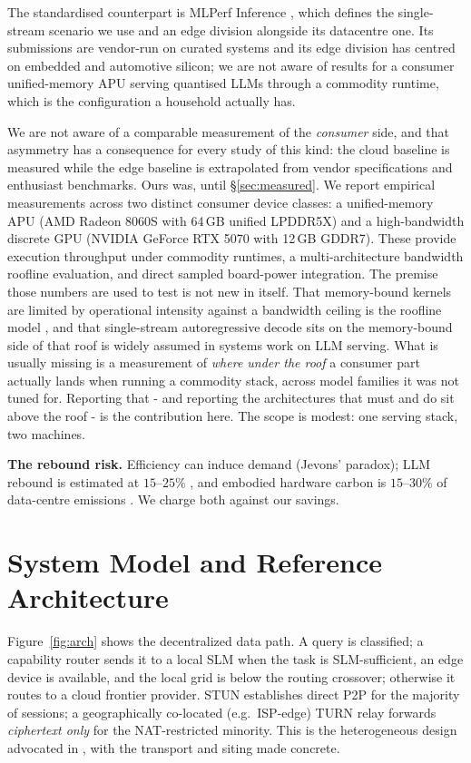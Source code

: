 \documentclass[conference]{IEEEtran}
\begin{document}
The standardised counterpart is MLPerf Inference \cite{reddi2020mlperf}, which
defines the single-stream scenario we use and an edge division alongside its
datacentre one. Its submissions are vendor-run on curated systems and its edge
division has centred on embedded and automotive silicon; we are not aware of
results for a consumer unified-memory APU serving quantised LLMs through a
commodity runtime, which is the configuration a household actually has.

We are not aware of a comparable measurement of the \emph{consumer} side, and
that asymmetry has a consequence for every study of this kind: the cloud
baseline is measured while the edge baseline is extrapolated from vendor
specifications and enthusiast benchmarks. Ours was, until \S\ref{sec:measured}.
We report empirical measurements across two distinct consumer device classes: a
unified-memory APU (AMD Radeon 8060S with 64\,GB unified LPDDR5X) and a
high-bandwidth discrete GPU (NVIDIA GeForce RTX 5070 with 12\,GB GDDR7). These
provide execution throughput under commodity runtimes, a multi-architecture
bandwidth roofline evaluation, and direct sampled board-power integration.
The premise those numbers are used to test is not new in itself. That
memory-bound kernels are limited by operational intensity against a bandwidth
ceiling is the roofline model \cite{williams2009roofline}, and that
single-stream autoregressive decode sits on the memory-bound side of that roof
is widely assumed in systems work on LLM serving. What is usually missing is a
measurement of \emph{where under the roof} a consumer part actually lands when
running a commodity stack, across model families it was not tuned for. Reporting
that - and reporting the architectures that must and do sit above the roof - is
the contribution here. The scope is modest: one serving stack, two machines.

\textbf{The rebound risk.}
Efficiency can induce demand (Jevons' paradox); LLM rebound is estimated at
$15$--$25\%$ \cite{luccioni2025}, and embodied hardware carbon is $15$--$30\%$ of
data-centre emissions \cite{schneider2025}. We charge both against our savings.

\section{System Model and Reference Architecture}
\label{sec:architecture}
Figure~\ref{fig:arch} shows the decentralized data path. A query is classified;
a capability router sends it to a local SLM when the task is SLM-sufficient, an
edge device is available, and the local grid is below the routing crossover;
otherwise it routes to a cloud frontier provider. STUN establishes direct P2P for
the majority of sessions; a geographically co-located (e.g.\ ISP-edge) TURN relay
forwards \emph{ciphertext only} for the NAT-restricted minority. This is the
heterogeneous design advocated in \cite{belcak2025}, with the transport and
siting made concrete.
\end{document}
